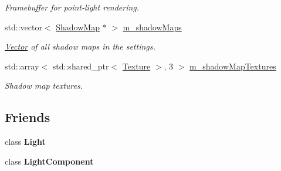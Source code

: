 \begin{Indent}
\begin{DoxyCompactItemize}
\begin{DoxyCompactList}\small\item\em Framebuffer for point-\/light rendering. \end{DoxyCompactList}\item 
\mbox{\label{classrev_1_1_lighting_settings_a48a6efaab62fd28cbfeca6df30a9dc0c}} 
std\+::vector$<$ \mbox{\hyperlink{classrev_1_1_shadow_map}{Shadow\+Map}} $\ast$ $>$ \mbox{\hyperlink{classrev_1_1_lighting_settings_a48a6efaab62fd28cbfeca6df30a9dc0c}{m\+\_\+shadow\+Maps}}
\begin{DoxyCompactList}\small\item\em \mbox{\hyperlink{classrev_1_1_vector}{Vector}} of all shadow maps in the settings. \end{DoxyCompactList}\item 
\mbox{\label{classrev_1_1_lighting_settings_af7d7bb65d740a0daec925ddc846e233d}} 
std\+::array$<$ std\+::shared\+\_\+ptr$<$ \mbox{\hyperlink{classrev_1_1_texture}{Texture}} $>$, 3 $>$ \mbox{\hyperlink{classrev_1_1_lighting_settings_af7d7bb65d740a0daec925ddc846e233d}{m\+\_\+shadow\+Map\+Textures}}
\begin{DoxyCompactList}\small\item\em Shadow map textures. \end{DoxyCompactList}\end{DoxyCompactItemize}
\end{Indent}
\subsection*{Friends}
\begin{DoxyCompactItemize}
\item 
\mbox{\label{classrev_1_1_lighting_settings_a27862a9fe512b352f98ec1c054680edd}} 
class {\bfseries Light}
\item 
\mbox{\label{classrev_1_1_lighting_settings_a2e7fdda96fb4e8a740d14d78a6808157}} 
class {\bfseries Light\+Component}
\end{DoxyCompactItemize}
